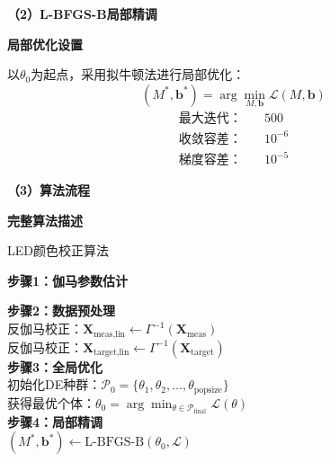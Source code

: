 \noindent\textbf{（2）L-BFGS-B局部精调}

 \textbf{局部优化设置}

以$\theta_0$为起点，采用拟牛顿法进行局部优化：
\begin{equation}
  (M^*,\mathbf{b}^*) = \arg\min_{M,\mathbf{b}} \mathcal{L}(M,\mathbf{b})
\end{equation}
\begin{align}
  \text{最大迭代：} &\quad 500\\
  \text{收敛容差：} &\quad 10^{-6}\\
  \text{梯度容差：} &\quad 10^{-5}
\end{align}

\noindent\textbf{（3）算法流程}

 \textbf{完整算法描述}

\begin{algorithm}[H]\small
{} %
\renewcommand{\algorithmcfname}{算法}
	\caption{LED颜色校正算法}
	
	\textbf{步骤1：伽马参数估计}\\
	
	\textbf{步骤2：数据预处理}\\
	反伽马校正：$\mathbf{X}_{\text{meas,lin}} \leftarrow \Gamma^{-1}(\mathbf{X}_{\text{meas}})$\\
	反伽马校正：$\mathbf{X}_{\text{target,lin}} \leftarrow \Gamma^{-1}(\mathbf{X}_{\text{target}})$\\
	
	\textbf{步骤3：全局优化}\\
	初始化DE种群：$\mathcal{P}_0 = \{\theta_1, \theta_2, \ldots, \theta_{\text{popsize}}\}$\\
	获得最优个体：$\theta_0 = \arg\min_{\theta \in \mathcal{P}_{\text{final}}} \mathcal{L}(\theta)$\\
	
	\textbf{步骤4：局部精调}\\
	$(M^*, \mathbf{b}^*) \leftarrow \text{L-BFGS-B}(\theta_0, \mathcal{L})$\\
	
	\label{algorithm:led_correction}
\end{algorithm}
\vspace{20pt}

